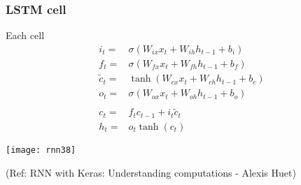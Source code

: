 \begin{frame}[fragile] \frametitle{LSTM cell}
Each cell
\begin{align*}
i_t =& \sigma(W_{ix} x_t + W_{ih} h_{t-1} + b_i) \\
f_t =& \sigma(W_{fx} x_t + W_{fh} h_{t-1} + b_f) \\
\tilde{c}_t =& \tanh(W_{cx} x_t + W_{ch} h_{t-1} + b_c) \\
o_t =& \sigma(W_{ox} x_t + W_{oh} h_{t-1} + b_o) \\
 \\
c_t =& f_t c_{t-1} + i_t \tilde{c}_t \\
h_t =& o_t \tanh(c_t)
\end{align*} %


\begin{center}
\texttt{[image: rnn38]}

{\tiny (Ref: RNN with Keras: Understanding computations - Alexis Huet)}
\end{center}
\end{frame}




